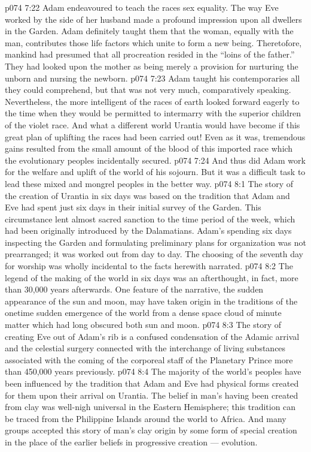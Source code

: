 \vs p074 7:22 \pc Adam endeavoured to teach the races sex equality. The way Eve worked by the side of her husband made a profound impression upon all dwellers in the Garden. Adam definitely taught them that the woman, equally with the man, contributes those life factors which unite to form a new being. Theretofore, mankind had presumed that all procreation resided in the “loins of the father.” They had looked upon the mother as being merely a provision for nurturing the unborn and nursing the newborn.
\vs p074 7:23 Adam taught his contemporaries all they could comprehend, but that was not very much, comparatively speaking. Nevertheless, the more intelligent of the races of earth looked forward eagerly to the time when they would be permitted to intermarry with the superior children of the violet race. And what a different world Urantia would have become if this great plan of uplifting the races had been carried out! Even as it was, tremendous gains resulted from the small amount of the blood of this imported race which the evolutionary peoples incidentally secured.
\vs p074 7:24 And thus did Adam work for the welfare and uplift of the world of his sojourn. But it was a difficult task to lead these mixed and mongrel peoples in the better way.
\vs p074 8:1 The story of the creation of Urantia in six days was based on the tradition that Adam and Eve had spent just six days in their initial survey of the Garden. This circumstance lent almost sacred sanction to the time period of the week, which had been originally introduced by the Dalamatians. Adam’s spending six days inspecting the Garden and formulating preliminary plans for organization was not prearranged; it was worked out from day to day. The choosing of the seventh day for worship was wholly incidental to the facts herewith narrated.
\vs p074 8:2 The legend of the making of the world in six days was an afterthought, in fact, more than 30,000 years afterwards. One feature of the narrative, the sudden appearance of the sun and moon, may have taken origin in the traditions of the onetime sudden emergence of the world from a dense space cloud of minute matter which had long obscured both sun and moon.
\vs p074 8:3 The story of creating Eve out of Adam’s rib is a confused condensation of the Adamic arrival and the celestial surgery connected with the interchange of living substances associated with the coming of the corporeal staff of the Planetary Prince more than 450,000 years previously.
\vs p074 8:4 \pc The majority of the world’s peoples have been influenced by the tradition that Adam and Eve had physical forms created for them upon their arrival on Urantia. The belief in man’s having been created from clay was well\hyp{}nigh universal in the Eastern Hemisphere; this tradition can be traced from the Philippine Islands around the world to Africa. And many groups accepted this story of man’s clay origin by some form of special creation in the place of the earlier beliefs in progressive creation --- evolution.
